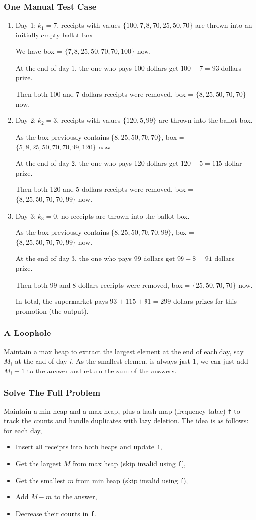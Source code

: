 \documentclass[12pt]{article}
\renewcommand{\t}{\texttt}
\begin{document}
\subsubsection{One Manual Test Case}
\begin{enumerate}
\item Day 1: $k_1=7$, receipts with values $\{100, 7, 8, 70, 25, 50, 70\}$ are thrown into an initially empty ballot box.

We have box = $\{7, 8, 25, 50, 70, 70, 100\}$ now.

At the end of day 1, the one who pays 100 dollars get $100-7=93$ dollars prize.

Then both 100 and 7 dollars receipts were removed, box = $\{8, 25, 50, 70, 70\}$ now.
\item Day 2: $k_2=3$, receipts with values $\{120, 5, 99\}$ are thrown into the ballot box.

As the box previously contains $\{8, 25, 50, 70, 70\}$, box = $\{5, 8, 25, 50, 70, 70, 99, 120\}$ now.

At the end of day 2, the one who pays 120 dollars get $120-5=115$ dollar prize.

Then both 120 and 5 dollars receipts were removed, box = $\{8, 25, 50, 70, 70, 99\}$ now.
\item Day 3: $k_3=0$, no receipts are thrown into the ballot box.

As the box previously contains $\{8, 25, 50, 70, 70, 99\}$, box = $\{8, 25, 50, 70, 70, 99\}$ now.

At the end of day 3, the one who pays 99 dollars get $99-8=91$ dollars prize.

Then both 99 and 8 dollars receipts were removed, box = $\{25, 50, 70, 70\}$ now.

In total, the supermarket pays $93+115+91=299$ dollars prizes for this promotion (the output).
\end{enumerate}
\subsubsection{A Loophole}
Maintain a max heap to extract the largest element at the end of each day, say $M_i$ at the end of day $i$. As the smallest element is always just $1$, we can just add $M_i-1$ to the answer and return the sum of the answers.
\subsubsection{Solve The Full Problem}
Maintain a min heap and a max heap, plus a hash map (frequency table) \t{f} to track the counts and handle duplicates with lazy deletion. The idea is as follows: for each day,
\begin{itemize}
\item Insert all receipts into both heaps and update \t{f},
\item Get the largest $M$ from max heap (skip invalid using \t{f}),
\item Get the smallest $m$ from min heap (skip invalid using \t{f}),
\item Add $M-m$ to the answer,
\item Decrease their counts in \t{f}.
\end{itemize}
\end{document}
